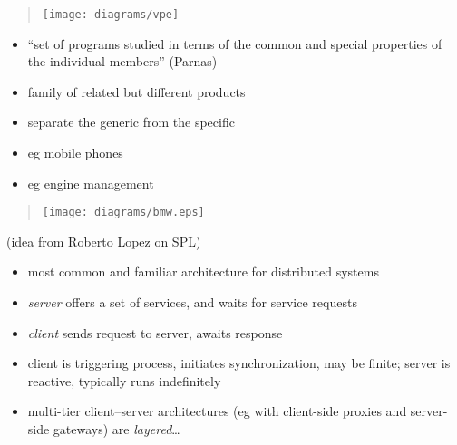 \documentclass{sepslide-soa-faked} %
\begin{document}
\begin{slide}
\begin{quote}
\texttt{[image: diagrams/vpe]}
\end{quote}
\end{slide}

\begin{slide}
\begin{itemize}
\item ``set of programs studied in terms of the common and special properties of the individual members'' (Parnas)
\item family of related but different products
\item separate the generic from the specific
\item eg mobile phones
\item eg engine management
\end{itemize}
\end{slide}

\begin{slide}
\begin{quote}
\texttt{[image: diagrams/bmw.eps]}
\end{quote}
(idea from Roberto Lopez on SPL)
\end{slide}

\begin{slide}
  \begin{itemize}
  \item most common and familiar architecture for distributed systems
  \item \emph{server} offers a set of services, and waits for service
    requests
  \item \emph{client} sends request to server, awaits response
  \item client is triggering process, initiates synchronization, may
    be finite; server is reactive, typically runs indefinitely
  \item multi-tier client--server architectures (eg with client-side
    proxies and server-side gateways) are \emph{layered}\ldots
  \end{itemize}
\end{slide}
\end{document}
